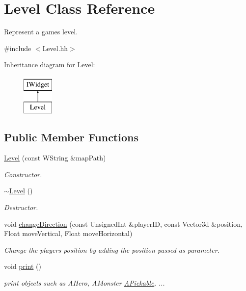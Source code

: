 \hypertarget{classLevel}{}\section{Level Class Reference}
\label{classLevel}


Represent a game\textquotesingle{}s level.  




{\ttfamily \#include $<$Level.\+hh$>$}

Inheritance diagram for Level\+:\begin{figure}[H]
\begin{center}
\leavevmode
\includegraphics[height=2.000000cm]{classLevel}
\end{center}
\end{figure}
\subsection*{Public Member Functions}
\begin{DoxyCompactItemize}
\item 
\mbox{\label{classLevel_a449da6ec6c9863a35c94d2fcb2755433}} 
\hyperlink{classLevel_a449da6ec6c9863a35c94d2fcb2755433}{Level} (const W\+String \&map\+Path)
\begin{DoxyCompactList}\small\item\em Constructor. \end{DoxyCompactList}\item 
\mbox{\label{classLevel_a249eac1e8f19ff44134efa5e986feaca}} 
\hyperlink{classLevel_a249eac1e8f19ff44134efa5e986feaca}{$\sim$\+Level} ()
\begin{DoxyCompactList}\small\item\em Destructor. \end{DoxyCompactList}\item 
void \hyperlink{classLevel_a7fbf2259277a0be256738886cd82796a}{change\+Direction} (const Unsigned\+Int \&player\+ID, const Vector3d \&position, Float move\+Vertical, Float move\+Horizontal)
\begin{DoxyCompactList}\small\item\em Change the player\textquotesingle{}s position by adding the position passed as parameter. \end{DoxyCompactList}\item 
\mbox{\label{classLevel_a5188de55912386ca786cdbe093ca2af4}} 
void \hyperlink{classLevel_a5188de55912386ca786cdbe093ca2af4}{print} ()
\begin{DoxyCompactList}\small\item\em print objects such as A\+Hero, A\+Monster \hyperlink{classAPickable}{A\+Pickable}, ... \end{DoxyCompactList}\end{DoxyCompactItemize}


